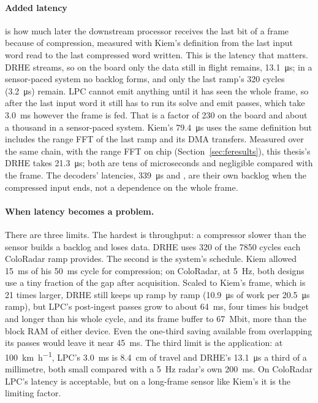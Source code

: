 \paragraph{Added latency} is how much later the downstream processor receives
the last bit of a frame because of compression, measured with Kiem's definition
from the last input word read to the last compressed word written. This is the
latency that matters. DRHE streams, so on the board only the data still in
flight remains, \SI{13.1}{\micro\second}; in a sensor-paced system no backlog
forms, and only the last ramp's 320 cycles (\SI{3.2}{\micro\second}) remain.
LPC cannot emit anything until it has seen the whole frame, so after the last
input word it still has to run its solve and emit passes, which take
\SI{3.0}{\milli\second} however the frame is fed. That is a factor of 230 on
the board and about a thousand in a sensor-paced system. Kiem's
\SI{79.4}{\micro\second} uses the same definition but includes the range FFT of
the last ramp and its DMA transfers. Measured over the same chain, with the
range FFT on chip (Section~\ref{sec:feresults}), this thesis's DRHE takes
\SI{21.3}{\micro\second}; both are tens of microseconds and negligible compared
with the frame. The decoders' latencies, \SI{339}{\micro\second} and
\lpcDecLat, are their own backlog when the compressed input ends, not a
dependence on the whole frame.

\paragraph{When latency becomes a problem.} There are three limits. The
hardest is throughput: a compressor slower than the sensor builds a backlog and
loses data. DRHE uses 320 of the \num{7850} cycles each ColoRadar ramp provides.
The second is the system's schedule. Kiem allowed \SI{15}{\milli\second} of his
\SI{50}{\milli\second} cycle for compression; on ColoRadar, at
\SI{5}{\hertz}, both designs use a tiny fraction of the gap after acquisition.
Scaled to Kiem's frame, which is 21 times larger, DRHE still keeps up ramp by
ramp (\SI{10.9}{\micro\second} of work per \SI{20.5}{\micro\second} ramp), but
LPC's post-ingest passes grow to about \SI{64}{\milli\second}, four times his
budget and longer than his whole cycle, and its frame buffer to
\SI{67}{\mega bit}, more than the block RAM of either device. Even the one-third
saving available from overlapping its passes would leave it near
\SI{45}{\milli\second}. The third limit is the application: at
\SI{100}{\kilo\metre\per\hour}, LPC's \SI{3.0}{\milli\second} is
\SI{8.4}{\centi\metre} of travel and DRHE's \SI{13.1}{\micro\second} a third of
a millimetre, both small compared with a \SI{5}{\hertz} radar's own
\SI{200}{\milli\second}. On ColoRadar LPC's latency is acceptable, but on a
long-frame sensor like Kiem's it is the limiting factor.

